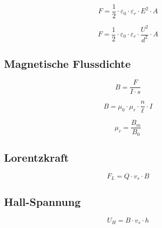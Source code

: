 \begin{equation}\label{eq:kondensator:anziehungskraft:elektrisches:feld}
F = \frac{1}{2}\cdot\varepsilon_0 \cdot
\varepsilon_r \cdot E^2 \cdot A
\end{equation}

\begin{equation}\label{eq:kondensator:anziehungskraft:spannung}
F = \frac{1}{2}\cdot\varepsilon_0 \cdot \varepsilon_r \cdot
 \frac{U^2}{d^2} \cdot A
\end{equation}

\subsection{Magnetische Flussdichte}
\begin{equation}\label{eq:magnetische:flussdichte}
B = \frac{F}{I \cdot s}
\end{equation}

\begin{equation}\label{eq:magnetische:flussdichte:schlanke:spule}
B = \mu_0 \cdot \mu_r \cdot \frac{n}{\ell} \cdot I
\end{equation}

\begin{equation}\label{eq:magnetische:flussdichte:relative:permeabilitaet}
\mu_r = \frac{B_m}{B_0}
\end{equation}

\subsection{Lorentzkraft}
\begin{equation}\label{eq:lorentzkraft}
F_L = Q \cdot v_s \cdot B
\end{equation}

\subsection{Hall-Spannung}
\begin{equation}\label{eq:hall:spannung}
U_H = B \cdot v_s \cdot h
\end{equation}

